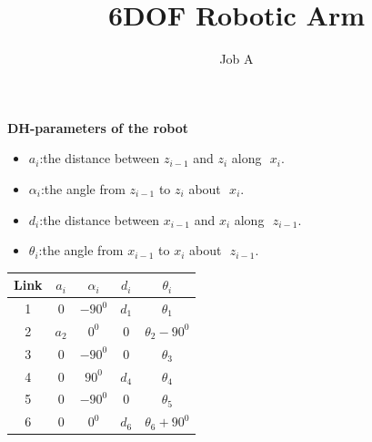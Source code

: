 \documentclass[12pt,a4paper]{article}
\author{Job A}
\title{6DOF Robotic Arm}
\begin{document}
\textbf{DH-parameters of the robot}
\begin{itemize}
\item $a_i$:\textrightarrow the distance between $z_{i-1}$ and $z_i$ along $\,\, x_i$.
\item $\alpha_i$:\textrightarrow the angle from $z_{i-1}$ to $z_i$ about $\,\, x_i$.
\item $d_i$:\textrightarrow  the distance between $x_{i-1}$ and $x_{i}$ along $\,\, z_{i-1}$.
\item $\theta_i$:\textrightarrow the angle from $x_{i-1}$ to $x_{i}$ about $\,\, z_{i-1}$.
\end{itemize}
\vspace*{10pt}

\begin{tabular}{|c|c|c|c|c|}
\hline 
Link & $a_i$ & $\alpha_i$ & $d_i$ & $\theta_i$ \\ 
\hline 
1 & 0 & $-90^0$ & $d_1$ & $\theta_1$ \\ 
\hline 
2 & $a_2$ & $0^0$ & 0 & $\theta_2 - 90^0$ \\ 
\hline 
3 & 0 & $-90^0$ & 0 & $\theta_3$ \\ 
\hline 
4 & 0 & $90^0$ & $d_4$ & $\theta_4$ \\ 
\hline 
5 & 0 & $-90^0$ & 0 & $\theta_5$ \\ 
\hline 
6 & 0 & $0^0$ & $d_6$ & $\theta_6 + 90^0$ \\ 
\hline 
\end{tabular} 
\vspace{10pt}
\end{document}
